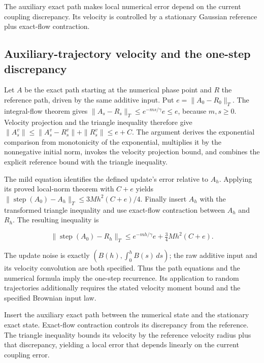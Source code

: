 \documentclass[11pt,a4paper]{report}
\begin{document}
The auxiliary exact path makes local numerical error depend on the current coupling discrepancy. Its velocity is controlled by a stationary Gaussian reference plus exact-flow contraction.

\subsection{\texorpdfstring{Auxiliary-trajectory velocity and the one-step discrepancy}{Auxiliary-trajectory velocity and the one-step discrepancy}}
\label{report-step-KineticLangevin-OneStep-lean-1}


Let \(A\) be the exact path starting at the numerical phase point and \(R\) the reference path, driven by the same additive input. Put \(e=\|A_0-R_0\|_T\). The integral-flow theorem gives \(\|A_s-R_s\|_T\le e^{-ms/\gamma}e\le e\), because \(m,s\ge0\). Velocity projection and the triangle inequality therefore give \(\|A_s^v\|\le\|A_s^v-R_s^v\|+\|R_s^v\|\le e+C\). The argument derives the exponential comparison from monotonicity of the exponential, multiplies it by the nonnegative initial norm, invokes the velocity projection bound, and combines the explicit reference bound with the triangle inequality.



The mild equation identifies the defined update's error relative to \(A_h\). Applying its proved local-norm theorem with \(C+e\) yields \(\|\operatorname{step}(A_0)-A_h\|_T\le3Mh^2(C+e)/4\). Finally insert \(A_h\) with the transformed triangle inequality and use exact-flow contraction between \(A_h\) and \(R_h\). The resulting inequality is

\[\|\operatorname{step}(A_0)-R_h\|_T\le e^{-mh/\gamma}e+\tfrac34Mh^2(C+e).\]

The update noise is exactly \((B(h),\int_0^hB(s)\,ds)\); the raw additive input and its velocity convolution are both specified. Thus the path equations and the numerical formula imply the one-step recurrence. Its application to random trajectories additionally requires the stated velocity moment bound and the specified Brownian input law.



Insert the auxiliary exact path between the numerical state and the stationary exact state. Exact-flow contraction controls its discrepancy from the reference. The triangle inequality bounds its velocity by the reference velocity radius plus that discrepancy, yielding a local error that depends linearly on the current coupling error.
\end{document}
